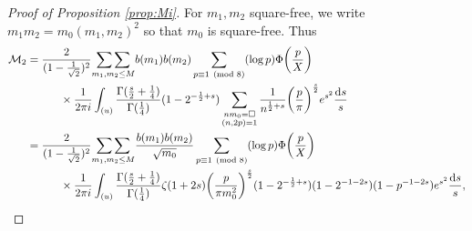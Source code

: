 \documentclass[10pt,a4paper]{amsart}
\newcommand{\dd}{\mathrm{d}}
\begin{document}
\begin{proof}[Proof of Proposition \ref{prop:Mi}]
For $m_1,m_2$ square-free, we write $m_1m_2=m_0(m_1,m_2)^2$ so that $m_0$ is square-free.
Thus
\begin{equation*}
\begin{split}
  \mathcal{M}_2&=
   \frac{2}{(1-\frac{1}{\sqrt{2}})^{2}}
  \underset{m_1,m_2\leq M}{\sum\sum}
  b(m_1)b(m_2)
  \sum_{p\equiv 1\pmod 8 }
  (\log p)\Phi\bigg(\frac{p}{X}\bigg)
  \\
&\hskip 30pt\times
  \frac{1}{2\pi i}
  \int_{(u)}
\frac{\Gamma(\frac{s}{2}+\frac{1}{4})}
{\Gamma(\frac{1}{4})}
(1-2^{-\frac{1}{2}+s})
  \sum_{\substack{nm_0=\square\\(n,2p)=1}}
\frac{1}
{n^{\frac{1}{2}+s}}
\bigg(\frac{p}{\pi}\bigg)^{\frac{s}{2}}
e^{s^2}\frac{\dd s}{s}\\
&=
 \frac{2}{(1-\frac{1}{\sqrt{2}})^{2}}
 \underset{m_1,m_2\leq M}{\sum\sum}
  \frac{b(m_1)b(m_2)}{\sqrt{m_0}}
  \sum_{p\equiv 1\pmod 8 }
  (\log p)\Phi\bigg(\frac{p}{X}\bigg)
  \\
&\hskip 30pt\times
  \frac{1}{2\pi i}
  \int_{(u)}
\frac{\Gamma(\frac{s}{2}+\frac{1}{4})}
{\Gamma(\frac{1}{4})}
\zeta(1+2s)\bigg(\frac{p}{\pi m_0^2}\bigg)^{\frac{s}{2}}
(1-2^{-\frac{1}{2}+s})
(1-2^{-1-2s})
(1-p^{-1-2s})
e^{s^2}\frac{\dd s}{s},
\end{split}
\end{equation*}


\end{proof}
\end{document}
